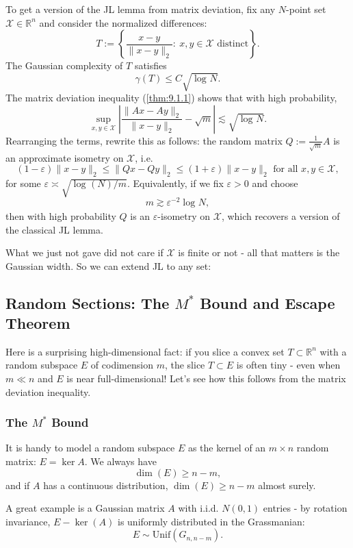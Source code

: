 To get a version of the JL lemma from matrix deviation, fix any $N$-point set $\mathcal{X} \in \mathbb{R}^n$ 
and consider the normalized differences: 
\[ T := \left\{ \frac{x - y}{\lVert x - y \rVert_{2}}: \ x, y \in \mathcal{X} \text{ distinct} \right\}. \]
The Gaussian complexity of $T$ satisfies 
\[ \gamma(T) \leq C \sqrt{\log_{}{N}}. \]
The matrix deviation inequality (\cref{thm:9.1.1}) shows that with high probability, 
\[ \sup_{x, y \in \mathcal{X}} \left| \frac{\lVert Ax - Ay \rVert_{2}}{\lVert x - y \rVert_{2}} - 
\sqrt{m} \right| \lesssim \sqrt{\log_{}{N}}. \]
Rearranging the terms, rewrite this as follows: the random matrix $Q := \frac{1}{\sqrt{m}}A$ is an approximate 
isometry on $\mathcal{X}$, i.e.
\[ (1 - \varepsilon)\lVert x - y \rVert_{2} \leq \lVert Qx - Qy \rVert_{2} \leq (1 + \varepsilon)\lVert x - y
\rVert_{2} \text{ for all } x, y \in \mathcal{X}, \]
for some $\varepsilon \asymp \sqrt{\log_{}{(N)} / m}$. Equivalently, if we fix $\varepsilon > 0$ and choose 
\[ m \gtrsim \varepsilon^{-2} \log_{}{N}, \]
then with high probability $Q$ is an $\varepsilon$-isometry on $\mathcal{X}$, which recovers a version of the 
classical JL lemma.

What we just not gave did not care if $\mathcal{X}$ is finite or not - all that matters is the Gaussian width. 
So we can extend JL to any set:




\subsection{Random Sections: The \texorpdfstring{$M^*$}{} Bound and Escape Theorem}
Here is a surprising high-dimensional fact: if you slice a convex set $T \subset \mathbb{R}^n$ with a random 
subspace $E$ of codimension $m$, the slice $T \subset E$ is often tiny - even when $m \ll n$ and $E$ is near 
full-dimensional! Let's see how this follows from the matrix deviation inequality.


\subsubsection{The \texorpdfstring{$M^*$}{} Bound}
It is handy to model a random subspace $E$ as the kernel of an $m \times n$ random matrix: $E = \ker{A}$. We 
always have 
\[ \dim{(E)} \geq n - m, \]
and if $A$ has a continuous distribution, $\dim{(E)} \geq n - m$ almost surely.

A great example is a Gaussian matrix $A$ with i.i.d. $N(0, 1)$ entries - by rotation invariance, $E - \ker{(A)}$ 
is uniformly distributed in the Grassmanian:
\[ E \sim \mathrm{Unif}(G_{n, n - m}). \]

